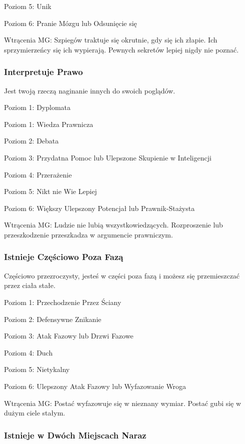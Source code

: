 Poziom 5: Unik

Poziom 6: Pranie Mózgu lub Odsunięcie się

Wtrącenia MG: Szpiegów traktuje się okrutnie, gdy się ich złapie. Ich sprzymierzeńcy się ich wypierają. Pewnych sekretów lepiej nigdy nie poznać.

\subsubsection{Interpretuje Prawo}

Jest twoją rzeczą naginanie innych do swoich poglądów.

Poziom 1: Dyplomata

Poziom 1: Wiedza Prawnicza

Poziom 2: Debata

Poziom 3: Przydatna Pomoc lub Ulepszone Skupienie w Inteligencji

Poziom 4: Przerażenie

Poziom 5: Nikt nie Wie Lepiej

Poziom 6: Większy Ulepszony Potencjał lub Prawnik-Stażysta

Wtrącenia MG: Ludzie nie lubią wszystkowiedzących. Rozproszenie lub przeszkodzenie przeszkadza w argumencie prawniczym.

\subsubsection{Istnieje Częściowo Poza Fazą}

Częściowo przezroczysty, jesteś w części poza fazą i możesz się przemieszczać przez ciała stałe. 

Poziom 1: Przechodzenie Przez Ściany

Poziom 2: Defensywne Znikanie

Poziom 3: Atak Fazowy lub Drzwi Fazowe

Poziom 4: Duch

Poziom 5: Nietykalny

Poziom 6: Ulepszony Atak Fazowy lub Wyfazowanie Wroga

Wtrącenia MG: Postać wyfazowuje się w nieznany wymiar. Postać gubi się w dużym ciele stałym. 

\subsubsection{Istnieje w Dwóch Miejscach Naraz}

